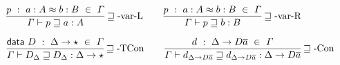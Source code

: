 \begin{figure}

\begin{align*}
  \frac{
  p\ :\ a:A\approx b:B\ \in\ \varGamma
}{
  \varGamma\vdash p\sqsupseteq a:A
  }\operatorname{\sqsupseteq-var-L} \quad & \quad \frac{
    p\ :\ a:A\approx b:B\ \in\ \varGamma
  }{
    \varGamma\vdash p\sqsupseteq b:B
    }\operatorname{\sqsupseteq-var-R} \\
\end{align*}

\begin{align*}
\frac{\mathsf{data}\ D\ :\ \Delta\rightarrow\star\ \in\ \varGamma
}{
\varGamma\vdash D_{\Delta}\sqsupseteq D_{\Delta}:\Delta\rightarrow\star
}\operatorname{\sqsupseteq-TCon} \quad & \quad \frac{
d\ :\ \Delta\rightarrow D\overline{a}\ \in\ \varGamma
}{
\varGamma\vdash d_{\Delta\rightarrow D\overline{a}}\sqsupseteq d_{\Delta\rightarrow D\overline{a}}:\Delta\rightarrow D\overline{a}
}\operatorname{\sqsupseteq-Con}\\
\end{align*}


\end{figure}
